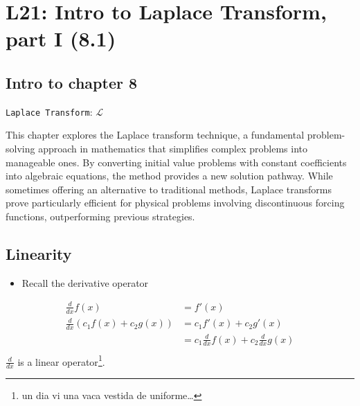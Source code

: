 \documentclass[
  letterpaper,
  DIV=11,
  numbers=noendperiod]{scrreprt}
\providecommand{\tightlist}{%
  \setlength{\itemsep}{0pt}\setlength{\parskip}{0pt}}
\theoremstyle{plain}
\theoremstyle{remark}
\begin{document}

\chapter{L21: Intro to Laplace Transform, part I
(8.1)}\label{l21-intro-to-laplace-transform-part-i-8.1-1}

\section{Intro to chapter 8}\label{intro-to-chapter-8}

\texttt{Laplace\ Transform}: \(\mathscr{L}\)

This chapter explores the Laplace transform technique, a fundamental
problem-solving approach in mathematics that simplifies complex problems
into manageable ones. By converting initial value problems with constant
coefficients into algebraic equations, the method provides a new
solution pathway. While sometimes offering an alternative to traditional
methods, Laplace transforms prove particularly efficient for physical
problems involving discontinuous forcing functions, outperforming
previous strategies.

\section{Linearity}\label{linearity}

\begin{itemize}
\tightlist
\item
  Recall the derivative operator
\end{itemize}

\begin{align}
\frac{d}{dx} f(x)&=f'(x)\\
\frac{d}{dx} (c_1f(x)+c_2g(x))&=c_1f'(x)+c_2g'(x)\\
&=c_1\frac{d}{dx}f(x)+c_2\frac{d}{dx}g(x)\\
\end{align} \(\frac{d}{dx}\) is a linear operator\footnote{un dia vi una
  vaca vestida de uniforme\ldots{}}.
\end{document}
